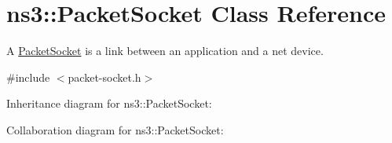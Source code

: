 \hypertarget{classns3_1_1PacketSocket}{}\section{ns3\+:\+:Packet\+Socket Class Reference}
\label{classns3_1_1PacketSocket}


A \hyperlink{classns3_1_1PacketSocket}{Packet\+Socket} is a link between an application and a net device.  




{\ttfamily \#include $<$packet-\/socket.\+h$>$}



Inheritance diagram for ns3\+:\+:Packet\+Socket\+:


Collaboration diagram for ns3\+:\+:Packet\+Socket\+:
